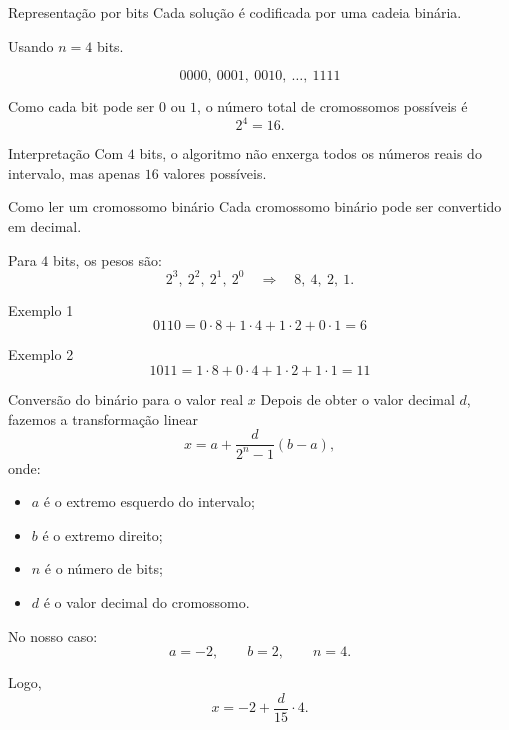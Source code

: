 \documentclass[mathserif, 10pt]{beamer}
\begin{document}
\begin{frame}{Representação por bits}
	Cada solução é codificada por uma cadeia binária.
	
	\pause
	
	Usando \(n=4\) bits.
	
	\[
	0000,\ 0001,\ 0010,\ \dots,\ 1111
	\]
	
	\pause
	
	Como cada bit pode ser \(0\) ou \(1\), o número total de cromossomos possíveis é
	\[
	2^4=16.
	\]
	
	\pause
	
	\begin{block}{Interpretação}
		Com \(4\) bits, o algoritmo não enxerga todos os números reais do intervalo, mas apenas \(16\) valores possíveis.
	\end{block}
\end{frame}

\begin{frame}{Como ler um cromossomo binário}
	Cada cromossomo binário pode ser convertido em decimal.
	
	\vspace{0.3cm}
	
	Para \(4\) bits, os pesos são:
	\[
	2^3,\ 2^2,\ 2^1,\ 2^0
	\quad\Rightarrow\quad
	8,\ 4,\ 2,\ 1.
	\]
	
	\pause
	
	\begin{exampleblock}{Exemplo 1}
		\[
		0110 = 0\cdot 8 + 1\cdot 4 + 1\cdot 2 + 0\cdot 1 = 6
		\]
	\end{exampleblock}
	
	\pause
	
	\begin{exampleblock}{Exemplo 2}
		\[
		1011 = 1\cdot 8 + 0\cdot 4 + 1\cdot 2 + 1\cdot 1 = 11
		\]
	\end{exampleblock}
\end{frame}

\begin{frame}{Conversão do binário para o valor real \(x\)}
	Depois de obter o valor decimal \(d\), fazemos a transformação linear
	\[
	x=a+\frac{d}{2^n-1}(b-a),
	\]
	onde:
	\begin{itemize}
		\item \(a\) é o extremo esquerdo do intervalo;
		\item \(b\) é o extremo direito;
		\item \(n\) é o número de bits;
		\item \(d\) é o valor decimal do cromossomo.
	\end{itemize}
	
	\pause
	
	No nosso caso:
	\[
	a=-2,\qquad b=2,\qquad n=4.
	\]
	
	Logo,
	\[
	x=-2+\frac{d}{15}\cdot 4.
	\]
\end{frame}
\end{document}
